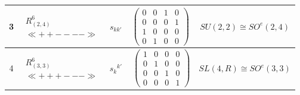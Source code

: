 \begin{center}
\begin{tabular}{|c|c|c|c|c|}
\hline


3 &


$\begin{array}{c} R^6_{(2,4)}\\ \ll ++---- \gg \end{array}$ &


$s_{kk'}$ &


$


\begin{pmatrix}


0 & 0 & 1 & 0\\


0 & 0 & 0 & 1\\


1 & 0 & 0 & 0\\


0 & 1 & 0 & 0


\end{pmatrix}


$&


$SU(2,2) \cong SO^e(2,4)$\\


\hline


4 &


$\begin{array}{c} R^6_{(3,3)}\\ \ll +++--- \gg \end{array}$ &


$s_k{}^{k'}$ &


$\


\begin{pmatrix}


1 & 0 & 0 & 0\\


0 & 1 & 0 & 0\\


0 & 0 & 1 & 0\\


0 & 0 & 0 & 1


\end{pmatrix}


$&


$SL(4,R) \cong SO^e(3,3)$\\


\hline


\end{tabular}


\end{center}




\medskip






